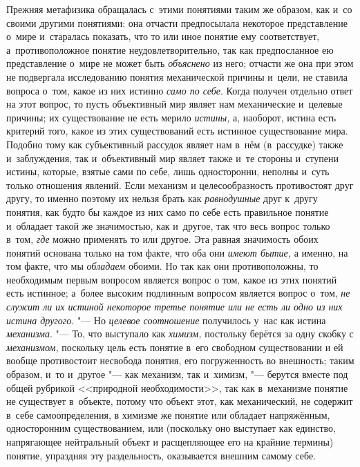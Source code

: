 Прежняя метафизика обращалась с~этими понятиями таким же
образом, как и~со своими другими понятиями: она отчасти предпосылала
некоторое представление о~мире и~старалась показать, что то или иное
понятие ему соответствует, а~противоположное понятие неудовлетворительно,
так как предпосланное ею представление о~мире не может быть
{\em объяснено} из него;
отчасти же она при этом не подвергала исследованию понятия механической
причины и~цели, не ставила вопроса о~том, какое из них истинно
{\em само по себе}. Когда
получен отдельно ответ на этот вопрос, то пусть объективный мир являет нам
механические и~целевые причины; их существование не есть мерило
{\em истины,} а,
наоборот, истина есть критерий того, какое из этих существований есть
истинное существование мира. Подобно тому как субъективный рассудок являет
нам в~нём (в~рассудке) также и~заблуждения, так и~объективный мир являет
также и~те стороны и~ступени истины, которые, взятые сами по себе, лишь
односторонни, неполны и~суть только отношения явлений. Если механизм и
целесообразность противостоят друг другу, то именно поэтому их нельзя брать
как {\em равнодушные}
друг к~другу понятия, как будто бы каждое из них само по себе
есть правильное понятие и~обладает такой же значимостью, как и~другое, так
что весь вопрос только в~том, {\em где}
можно применять то или другое. Эта равная
значимость обоих понятий основана только на том факте, что
оба они {\em имеют бытие,}
а именно, на том факте, что мы
{\em обладаем} обоими. Но
так как они противоположны, то необходимым первым вопросом является вопрос
о том, какое из этих понятий есть истинное; а~более высоким подлинным
вопросом является вопрос о~том, {\em не
служит ли их истиной некоторое третье понятие или не есть ли одно из них
истина другого}. "--- Но
{\em целевое соотношение}
получилось у~нас как истина
{\em механизма}. "--- То,
что выступало как {\em химизм,}
постольку берётся за одну скобку с
{\em механизмом,}
поскольку цель есть понятие в~его свободном существовании и
ей вообще противостоит несвобода понятия, его погруженность во внешность;
таким образом, и~то и~другое "--- как механизм, так и~химизм,
"--- берутся вместе под общей рубрикой <<природной
необходимости>>, так как в~механизме понятие не существует в~объекте, потому
что объект этот, как механический, не содержит в~себе самоопределения, в
химизме же понятие или обладает напряжённым, односторонним существованием,
или (поскольку оно выступает как единство, напрягающее нейтральный объект и
расщепляющее его на крайние термины) понятие, упраздняя эту раздельность,
оказывается внешним самому себе.

